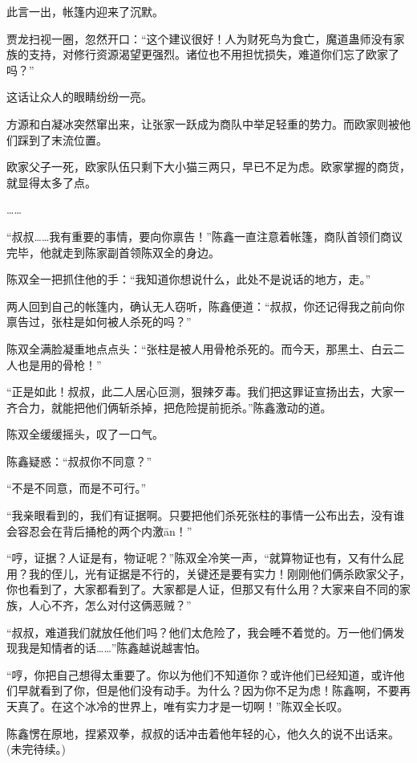 \begin{this_body}
此言一出，帐篷内迎来了沉默。

贾龙扫视一圈，忽然开口：“这个建议很好！人为财死鸟为食亡，魔道蛊师没有家族的支持，对修行资源渴望更强烈。诸位也不用担忧损失，难道你们忘了欧家了吗？”

这话让众人的眼睛纷纷一亮。

方源和白凝冰突然窜出来，让张家一跃成为商队中举足轻重的势力。而欧家则被他们踩到了末流位置。

欧家父子一死，欧家队伍只剩下大小猫三两只，早已不足为虑。欧家掌握的商货，就显得太多了点。

……

“叔叔……我有重要的事情，要向你禀告！”陈鑫一直注意着帐篷，商队首领们商议完毕，他就走到陈家副首领陈双全的身边。

陈双全一把抓住他的手：“我知道你想说什么，此处不是说话的地方，走。”

两人回到自己的帐篷内，确认无人窃听，陈鑫便道：“叔叔，你还记得我之前向你禀告过，张柱是如何被人杀死的吗？”

陈双全满脸凝重地点点头：“张柱是被人用骨枪杀死的。而今天，那黑土、白云二人也是用的骨枪！”

“正是如此！叔叔，此二人居心叵测，狠辣歹毒。我们把这罪证宣扬出去，大家一齐合力，就能把他们俩斩杀掉，把危险提前扼杀。”陈鑫激动的道。

陈双全缓缓摇头，叹了一口气。

陈鑫疑惑：“叔叔你不同意？”

“不是不同意，而是不可行。”

“我亲眼看到的，我们有证据啊。只要把他们杀死张柱的事情一公布出去，没有谁会容忍会在背后捅枪的两个内激ān！”

“哼，证据？人证是有，物证呢？”陈双全冷笑一声，“就算物证也有，又有什么屁用？我的侄儿，光有证据是不行的，关键还是要有实力！刚刚他们俩杀欧家父子，你也看到了，大家都看到了。大家都是人证，但那又有什么用？大家来自不同的家族，人心不齐，怎么对付这俩恶贼？”

“叔叔，难道我们就放任他们吗？他们太危险了，我会睡不着觉的。万一他们俩发现我是知情者的话……”陈鑫越说越害怕。

“哼，你把自己想得太重要了。你以为他们不知道你？或许他们已经知道，或许他们早就看到了你，但是他们没有动手。为什么？因为你不足为虑！陈鑫啊，不要再天真了。在这个冰冷的世界上，唯有实力才是一切啊！”陈双全长叹。

陈鑫愣在原地，捏紧双拳，叔叔的话冲击着他年轻的心，他久久的说不出话来。(未完待续。)

\end{this_body}

